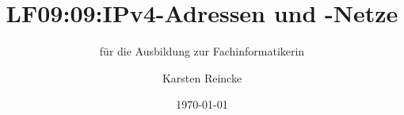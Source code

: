 \documentclass[]{beamer}
\title{LF09:09:IPv4-Adressen und -Netze}
\subtitle{für die Ausbildung zur Fachinformatikerin}
\institute{GS-LDK}
\author{Karsten Reincke}
\date{\today}
\def\cfgGl{../../../cfg.gl/}
\begin{document}

\begin{frame}
  \titlepage
\end{frame}






\logo{}
\newpage



%
\end{document}
